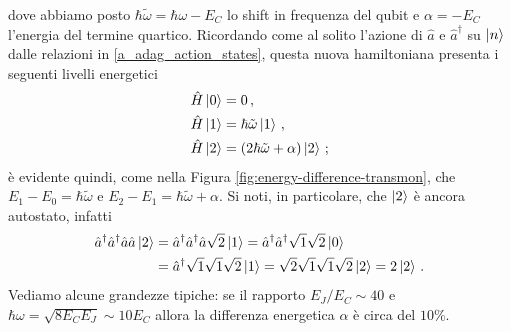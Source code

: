 dove abbiamo posto $\hbar\tilde{\omega}=\hbar\omega-E_C$ lo shift in frequenza del qubit e $\alpha = -E_C$ l'energia del termine quartico. Ricordando come al solito l'azione di $\hat{a}$ e $\hat{a}^\dag$ su $\ket{n}$ dalle relazioni in \eqref{a_adag_action_states}, questa nuova hamiltoniana presenta i seguenti livelli energetici
\begin{align*}
    \hat H \ket 0 &= 0 \, , \\
    \hat H \ket 1 &= \hbar\tilde{\omega} \ket{1} \, , \\
    \hat H \ket 2 &= \left( 2\hbar\tilde{\omega}+\alpha \right) \ket{2} \, ;
\end{align*}
è evidente quindi, come nella Figura \ref{fig:energy-difference-transmon}, che $E_1-E_0 = \hbar \tilde{\omega}$ e $E_2 - E_1 = \hbar \tilde{\omega} + \alpha$. Si noti, in particolare, che $\ket 2$ è ancora autostato, infatti
\begin{align*}
    \hat a^\dagger \hat a^\dagger \hat a \hat a\ket 2 &= \hat a^\dagger \hat a^\dagger \hat a \sqrt 2 \ket 1 = \hat a^\dagger \hat a^\dagger \sqrt 1\sqrt 2 \ket 0 \\
    &= \hat a^\dagger \sqrt 1 \sqrt 1 \sqrt 2 \ket 1 = \sqrt 2 \sqrt 1 \sqrt 1 \sqrt 2 \ket 2 = 2\ket 2 \, .
\end{align*}
Vediamo alcune grandezze tipiche: se il rapporto $E_J/E_C \sim 40$ e $\hbar\omega=\sqrt{8E_CE_J}\sim 10E_C$ allora la differenza energetica $\alpha$ è circa del $10$\%. 

